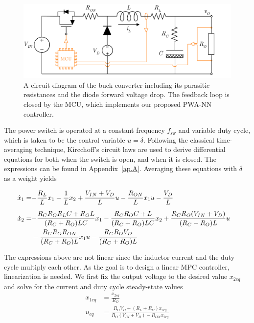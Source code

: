 \begin{figure}[t]
	\centering
	\includegraphics[width=0.8\linewidth]{../images/chap4_buck_schematic.pdf}
	\caption{A circuit diagram of the buck converter including its parasitic resistances and the diode forward voltage drop. The feedback loop is closed by the MCU, which implements our proposed PWA-NN controller.}
	\label{fig:buck}
\end{figure}


The power switch is operated at a constant frequency $f_{\text{sw}}$ and variable duty cycle, which is taken to be the control variable $u = \delta$. Following the classical time-averaging technique, Kircchoff's circuit laws are used to derive differential equations for both when the switch is open, and when it is closed. The expressions can be found in Appendix~\ref{ap.A}. Averaging these equations with $\delta$ as a weight yields

\begin{subequations}
	\begin{flalign}
		\dot{x}_1 = & \small{-\frac{R_L}{L}x_1 - \frac{1}{L}x_2 + \frac{V_{IN}+V_D}{L}u - \frac{R_{ON}}{L} x_1 u - \frac{V_D}{L} \label{eq.x1}} && \\[5pt]
		\dot{x}_2 = & \small{-\frac{R_C R_O R_L C + R_O L}{(R_C + R_O) L C}x_1 -\frac{R_C R_O C + L}{(R_C + R_O)L C}} x_2 + \frac{R_C R_O (V_{IN} + V_D)}{(R_C+R_O)L} u  &&\nonumber \\
		&- \frac{R_C R_O R_{ON}}{(R_C + R_O)L} x_1 u - \frac{R_C R_O V_D}{(R_C + R_O)L} \label{eq.x2} && 
	\end{flalign}
\end{subequations}

The expressions above are not linear since the inductor current and the duty cycle multiply each other. As the goal is to design a linear MPC controller, linearization is needed. We first fix the output voltage to the desired value $x_{2eq}$ and solve for the current and duty cycle steady-state values
%
\begin{align}
	x_{1eq} &= \frac{x_{2eq}}{R_O} \label{eq.x1eq}\\[5pt]
	u_{eq} &= \frac{R_O V_D + (R_L + R_O) x_{2eq}}{R_O(V_{IN}+V_D)-R_{ON} x_{2eq}} \label{eq.ueq}
\end{align}

